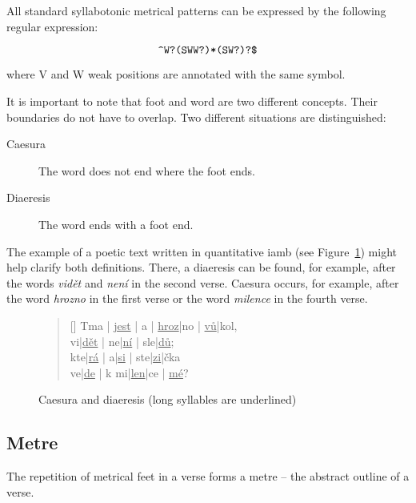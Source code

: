 All standard syllabotonic metrical patterns can be expressed by the following regular expression:

\begin{equation}\label{eq:syllabotonic-regex}
        \verb|^W?(SWW?)*(SW?)?$|
\end{equation}

where V and W weak positions are annotated with the same symbol. \cite{KVETA}

It is important to note that foot and word are two different concepts. Their boundaries do not have to overlap. Two different situations are distinguished:
\begin{description}
\item[Caesura] The word does not end where the foot ends.
\item[Diaeresis] The word ends with a foot end.~\cite{UvodTeorieVerse}
\end{description}

The example of a poetic text written in quantitative iamb (see Figure~\ref{fig:caesura-diaeresis}) might help clarify both definitions. There, a diaeresis can be found, for example, after the words \emph{vidět} and \emph{není} in the second verse. Caesura occurs, for example, after the word \emph{hrozno} in the first verse or the word \emph{milence} in the fourth verse.~\cite{TeorieLiteraturySS}

\begin{figure}[htpb]
    \centering
    \begin{verse}[\versewidth]
    Tma | \uline{jest} | a | \uline{hroz}|no | \uline{vů}|kol,\\
    vi|\uline{dět} | ne|\uline{ní} | sle|\uline{dů};\\
    kte|\uline{rá} | a|\uline{si} | ste|\uline{zi}|čka\\
    ve|\uline{de} | k mi|\uline{len}|ce | \uline{mé}?\\
    \end{verse}
    \caption[Caesura and diaeresis]{Caesura and diaeresis (long syllables are underlined)}\label{fig:caesura-diaeresis}
\end{figure}

\subsection{Metre}
The repetition of metrical feet in a verse forms a metre -- the abstract outline of a verse.~\cite{UvodTeorieVerse}

